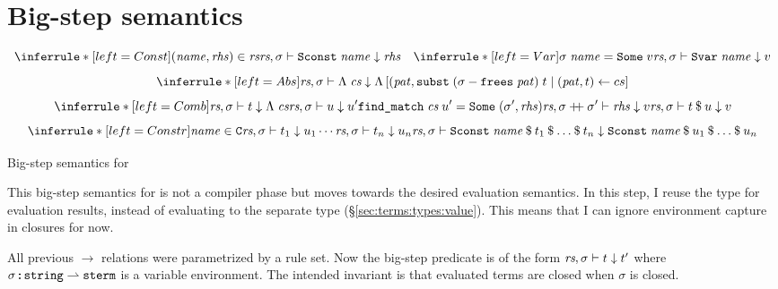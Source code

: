
\section{Big-step semantics}
\label{sec:intermediate:bigstep}

\begin{code}[t]
  \[
    \inferrule*[left=Const]{(\mathit{name}, \mathit{rhs}) \in \rs}{\seval{\rs}{\sigma}{\holconst{Sconst}\;\mathit{name}}{\mathit{rhs}}}\quad
    \inferrule*[left=Var]{\sigma\;\mathit{name} = \holconst{Some}\;v}{\seval{\rs}{\sigma}{\holconst{Svar}\;\mathit{name}}{v}}
  \]
  \[
    \inferrule*[left=Abs]{ }{\seval\rs\sigma{\Lambda\;\cs}{\Lambda \left[ (\mathit{pat}, \holconst{subst}\;(\sigma - \holconst{frees}\;\mathit{pat})\;t \mid (\mathit{pat}, t) \leftarrow cs \right]}}
  \]
  \[
    \inferrule*[left=Comb]{
      \seval\rs\sigma{t}{\Lambda\;\cs} \\
      \seval\rs\sigma{u}{u'} \\
      \holconst{find\_match}\;\cs\;u' = \holconst{Some}\;(\sigma', \mathit{rhs}) \\
      \seval\rs{\envadd{\sigma}{\sigma'}}{\mathit{rhs}}{v}
    }{\seval\rs\sigma{\app t u}{v}}
  \]
  \[
    \inferrule*[left=Constr]{
      \mathit{name} \in \holconst{C} \\
      \seval\rs\sigma{t_1}{u_1} \\
      \cdots \\
      \seval\rs\sigma{t_n}{u_n}
    }{\seval\rs\sigma{\holconst{Sconst}\;\mathit{name}\mathbin\$t_1\mathbin\$\ldots\mathbin\$t_n}{\holconst{Sconst}\;\mathit{name}\mathbin\$u_1\mathbin\$\ldots\mathbin\$u_n}}
  \]
  \caption{Big-step semantics for }
  \label{code:intermediate:bigstep}
\end{code}

This big-step semantics for  is not a compiler phase but moves towards the desired evaluation semantics.
In this step, I reuse the  type for evaluation results, instead of evaluating to the separate type  (§\ref{sec:terms:types:value}).
This means that I can ignore environment capture in closures for now.

All previous $\longrightarrow$ relations were parametrized by a rule set.
Now the big-step predicate is of the form $\textit{rs}, \sigma \vdash t \downarrow t'$ where $\sigma \mathbin{:\!\!:} \texttt{\textup{string}}\rightharpoonup\texttt{\textup{sterm}}$ is a variable environment.
The intended invariant is that evaluated terms are closed when $\sigma$ is closed.

